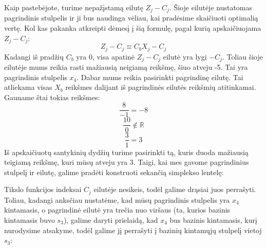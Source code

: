 \documentclass{article}
\begin{document}
Kaip pastebėjote, turime nepažįstamą eilutę $Z_j-C_j$. Šioje eilutėje nustatomas pagrindinis stulpelis ir ji bus naudinga vėliau, kai pradėsime skaičiuoti optimalią vertę. Kol kas pakanka atkreipti dėmesį į šią formulę, pagal kurią apskaičiuojama $Z_j-C_j$:
\begin{equation}\label{eq:3}
    Z_j-C_j\equiv C_bX_j-C_j
\end{equation}
Kadangi iš pradžių $C_b$ yra 0, visa apatinė $Z_j-C_j$ eilutė yra lygi $-C_j$. Toliau šioje eilutėje mums reikia rasti mažiausią neigiamą reikšmę, šiuo atveju -5. Tai yra pagrindinis stulpelis $x_4$. Dabar mums reikia pasirinkti pagrindinę eilutę. Tai atliekama visas $X_b$ reikšmes dalijant iš pagrindinės eilutės reikšmių atitinkamai. Gauname štai tokias reikšmes:
\begin{equation*}
    \frac{8}{-1} = -8
\end{equation*}
\begin{equation*}
    \frac{10}{0} \not\in \mathbb{R}
\end{equation*}
\begin{equation*}
    \frac{3}{1} = 3
\end{equation*}
Iš apskaičiuotų santykinių dydžių turime pasirinkti tą, kuris duoda mažiausią teigiamą reikšmę, kuri mūsų atveju yra 3. Taigi, kai mes gavome pagrindinius stulpelį ir eilutę, galime pradėti konstruoti sekančią simplekso lentelę:
\begin{table}[H]
    \centering
\end{table}
Tikslo funkcijos indeksai $C_j$ eilutėje nesikeis, todėl galime drąsiai juos perrašyti. Toliau, kadangi anksčiau nustatėme, kad mūsų pagrindinis stulpelis yra $x_4$ kintamasis, o pagrindinė eilutė yra trečia nuo viršaus (ta, kurios bazinis kintamasis buvo $s_3$), galime daryti prielaidą, kad $x_4$ bus bazinis kintamasis, kurį nurodysime atsakyme, todėl galime jį perrašyti į bazinių kintamųjų stulpelį vietoj $s_3$:
\end{document}
